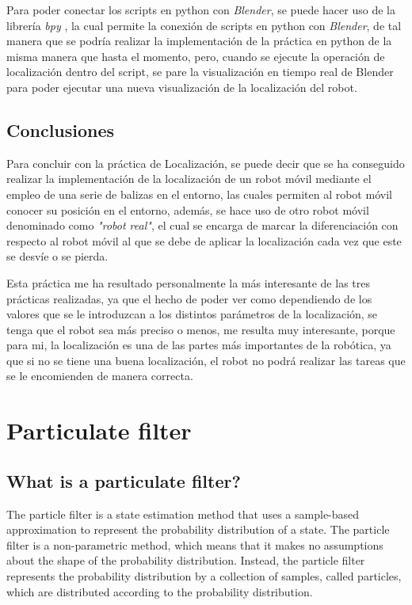 \documentclass[11pt]{report}
\begin{document}
Para poder conectar los scripts en python con \emph{Blender}, se puede hacer uso de la librería \emph{bpy} \cite{6}, la cual permite la conexión de scripts en python con \emph{Blender}, de tal manera que se podría realizar la implementación de la práctica en python de la misma manera que hasta el momento, pero, cuando se ejecute la operación de localización dentro del script, se pare la visualización en tiempo real de Blender para poder ejecutar una nueva visualización de la localización del robot.

\section{Conclusiones}

Para concluir con la práctica de Localización, se puede decir que se ha conseguido realizar la implementación de la localización de un robot móvil mediante el empleo de una serie de balizas en el entorno, las cuales permiten al robot móvil conocer su posición en el entorno, además, se hace uso de otro robot móvil denominado como \emph{"robot real"}, el cual se encarga de marcar la diferenciación con respecto al robot móvil al que se debe de aplicar la localización cada vez que este se desvíe o se pierda. 

Esta práctica me ha resultado personalmente la más interesante de las tres prácticas realizadas, ya que el hecho de poder ver como dependiendo de los valores que se le introduzcan a los distintos parámetros de la localización, se tenga que el robot sea más preciso o menos, me resulta muy interesante, porque para mi, la localización es una de las partes más importantes de la robótica, ya que si no se tiene una buena localización, el robot no podrá realizar las tareas que se le encomienden de manera correcta.

\chapter{Particulate filter}

\section{What is a particulate filter?}

The particle filter is a state estimation method that uses a sample-based approximation to represent the probability distribution of a state. The particle filter is a non-parametric method, which means that it makes no assumptions about the shape of the probability distribution. Instead, the particle filter represents the probability distribution by a collection of samples, called particles, which are distributed according to the probability distribution. 
\end{document}

